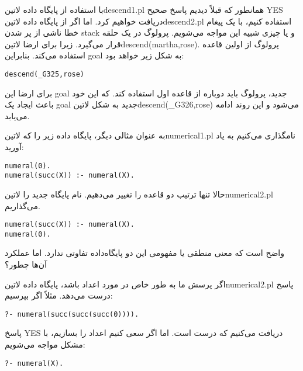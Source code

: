 با استفاده از پایگاه داده ‌لاتین{descend1.pl} همانطور که قبلاً دیدیم پاسخ صحیح YES دریافت خواهیم کرد.
اما اگر از پایگاه داده ‌لاتین{descend2.pl} استفاده کنیم، با یک پیغام خطا ناشی از پر شدن stack و یا چیزی شبیه این مواجه می‌شویم. پرولوگ در یک حلقه قرار می‌گیرد. زیرا برای ارضا ‌لاتین{descend(martha,rose).}  پرولوگ از اولین قاعده استفاده می‌کند. بنابراین goal به شکل زیر خواهد بود:

\begin{latin}
\begin{lstlisting}
descend(_G325,rose)
\end{lstlisting}
\end{latin}

برای ارضا این goal جدید، پرولوگ باید دوباره از قاعده اول استفاده کند. که این خود باعث ایجاد یک goal جدید به شکل ‌لاتین{descend(\_G326,rose)} می‌شود و این روند ادامه می‌یابد.

به عنوان مثالی دیگر، پایگاه داده زیر را که ‌لاتین{numerical1.pl} نامگذاری می‌کنیم به یاد آورید:

\begin{latin}
\begin{lstlisting}
numeral(0).
numeral(succ(X)) :- numeral(X).
\end{lstlisting}
\end{latin}

حالا تنها ترتیب دو قاعده را تغییر می‌دهیم. نام پایگاه جدید را ‌لاتین{numerical2.pl} می‌گذاریم.

\begin{latin}
\begin{lstlisting}
numeral(succ(X)) :- numeral(X).
numeral(0).
\end{lstlisting}
\end{latin}

واضح است که معنی منطقی یا مفهومی این دو پایگاه‌داده تفاوتی ندارد. اما عملکرد آن‌ها چطور؟

اگر پرسش ما به طور خاص در مورد اعداد باشد، پایگاه داده ‌لاتین{numerical2.pl} پاسخ درست می‌دهد. مثلاً اگر بپرسیم:

\begin{latin}
\begin{lstlisting}
?- numeral(succ(succ(succ(0)))).
\end{lstlisting}
\end{latin}

پاسخ YES دریافت می‌کنیم که درست است. اما اگر سعی کنیم اعداد را بسازیم، با مشکل مواجه می‌شویم:

\begin{latin}
\begin{lstlisting}
?- numeral(X).
\end{lstlisting}
\end{latin}


